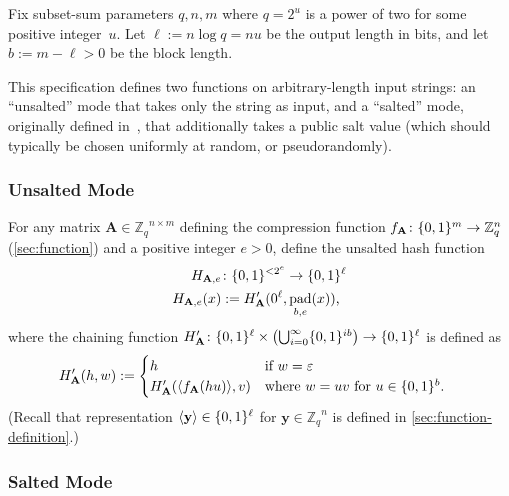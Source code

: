 \documentclass[11pt]{article}
\newcommand{\Z}{\ensuremath{\mathbb{Z}}}
\newcommand{\Zq}{\ensuremath{\Z_q}}
\DeclarePairedDelimiter\inner{\langle}{\rangle}
\DeclarePairedDelimiter\set{\{}{\}}
\DeclarePairedDelimiter\parens{(}{)}
\newcommand{\matA}{\ensuremath{\mathbf{A}}}
\newcommand{\vecy}{\ensuremath{\mathbf{y}}}
\numberwithin{equation}{section}
\newcommand{\bit}{\ensuremath{\set{0,1}}}
\DeclareMathOperator{\pad}{pad}
\begin{document}
Fix subset-sum parameters $q, n, m$ where $q=2^{u}$ is a power of two
for some positive integer~$u$.  Let $\ell := n \log q = n u$ be the
output length in bits, and let $b := m - \ell > 0$ be the block
length.

This specification defines two functions on arbitrary-length input
strings: an ``unsalted'' mode that takes only the string as input, and
a ``salted'' mode, originally defined
in~\cite{DBLP:conf/crypto/HaleviK06}, that additionally takes a public
salt value (which should typically be chosen uniformly at random, or
pseudorandomly).

\subsubsection{Unsalted Mode}
\label{sec:unsalted-mode}

For any matrix $\matA \in \Zq^{n \times m}$ defining the compression
function $f_{\matA} \colon \bit^{m} \to \Zq^{n}$ (\cref{sec:function})
and a positive integer $e > 0$, define the unsalted hash function
\begin{align}
  \label{eq:H}
  H_{\matA,e} &\colon \bit^{< 2^{e}} \to \bit^{\ell} \nonumber \\
  H_{\matA,e}(x) &:= H'_{\matA}(0^{\ell}, \pad_{b,e}(x)) \text{,}
\end{align}
where the chaining function
$H'_{\matA} \colon \bit^{\ell} \times \parens*{\bigcup_{i=0}^{\infty}
  \bit^{ib}} \to \bit^{\ell}$ is defined as
\begin{align}
  H'_{\matA}(h, w) &:= \begin{cases}
    h & \text{if } w = \varepsilon \\
    H'_{\matA}(\inner{f_{\matA}(h u)}, v) & \text{where } w = u v
    \text{ for } u \in \bit^{b} \text{.}
  \end{cases}
\end{align}
(Recall that representation $\inner{\vecy} \in \bit^{\ell}$ for
$\vecy \in \Zq^{n}$ is defined in \cref{sec:function-definition}.)

\subsubsection{Salted Mode}
\label{sec:salted-mode}
\end{document}
